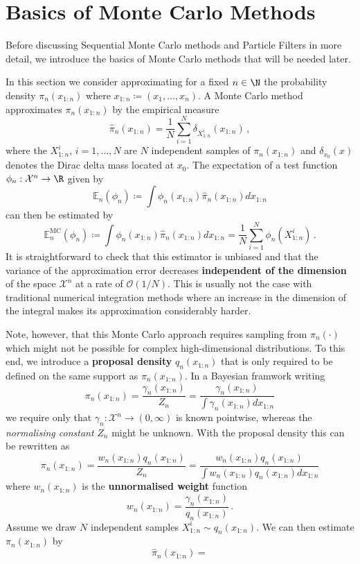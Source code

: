 \section*{Basics of Monte Carlo Methods}
Before discussing Sequential Monte Carlo methods and Particle Filters
in more detail, we introduce the basics of Monte Carlo methods that
will be needed later.

In this section we consider approximating for a fixed $n \in \N$ the
probability density $\pi_n(x_{1 : n})$ where
$x_{1:n} \coloneqq (x_1, \dotsc, x_n)$. A Monte Carlo method
approximates $\pi_n(x_{1:n})$ by the empirical measure
\[
  \hat{\pi}_n(x_{1:n}) = \frac{1}{N} \sum_{i = 1}^N
  \delta_{X_{1:n}^i}(x_{1:n})\,,
\]
where the $X_{1:n}^i$, $i = 1, \dotsc, N$ are $N$ independent samples
of $\pi_n(x_{1:n})$ and $\delta_{x_0}(x)$ denotes the Dirac delta mass
located at $x_0$. The expectation of a test function
$\phi_n : \mathcal{X}^n \rightarrow \R$ given by
\[
  \mathbb{E}_n(\phi_n) \coloneqq \int \phi_n(x_{1:n})
  \hat{\pi}_n(x_{1:n}) dx_{1:n}
\]
can then be estimated by
\[
  \mathbb{E}_n^{\text{MC}}(\phi_n) \coloneqq \int \phi_n(x_{1:n})
  \hat{\pi}_n(x_{1:n}) dx_{1:n} = \frac{1}{N} \sum_{i=1}^N
  \phi_n(X_{1:n}^i) \,.
\]
It is straightforward to check that this estimator is unbiased and
that the variance of the approximation error decreases
\textbf{independent of the dimension} of the space $\mathcal{X}^n$ at
a rate of $\mathcal{O}(1/N)$. This is usually not the case with
traditional numerical integration methods where an increase in the
dimension of the integral makes its approximation considerably harder.

Note, however, that this Monte Carlo approach requires sampling from
$\pi_n(\cdot)$ which might not be possible for complex
high-dimensional distributions. To this end, we introduce a
\textbf{proposal density} $q_n(x_{1:n})$ that is only required to be
defined on the same support as $\pi_n(x_{1:n})$. In a Bayesian
framwork writing
\[
  \pi_n(x_{1:n}) = \frac{\gamma_n(x_{1:n})}{Z_n} =
  \frac{\gamma_n(x_{1:n})}{\int \gamma_n(x_{1:n}) dx_{1:n}}
\]
we require only that
$\gamma_n : \mathcal{X}^n \rightarrow (0, \infty)$ is known pointwise,
whereas the \emph{normalising constant} $Z_n$ might be unknown. With
the proposal density this can be rewritten as
\begin{equation}
  \label{eq:is:density}
  \pi_n(x_{1:n}) = \frac{w_n(x_{1:n})q_n(x_{1:n})}{Z_n} = \frac{w_n(x_{1:n})q_n(x_{1:n})}{\int w_n(x_{1:n})q_n(x_{1:n})dx_{1:n}}
\end{equation}
where $w_n(x_{1:n})$ is the \textbf{unnormalised weight} function
\[
  w_n(x_{1:n}) = \frac{\gamma_n(x_{1:n})}{q_n(x_{1:n})}\,.
\]
Assume we draw $N$ independent samples $X_{1:n}^i \sim q_n(x_{1:n})$.
We can then estimate $\pi_n(x_{1:n})$ by
\[
  \hat{\pi}_n(x_{1:n}) =
\]






















